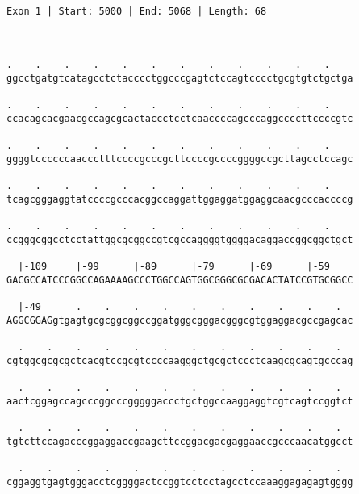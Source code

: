 \documentclass{article}
\begin{document}
 \begin{Verbatim}
 
Exon 1 | Start: 5000 | End: 5068 | Length: 68



.    .    .    .    .    .    .    .    .    .    .    .    
ggcctgatgtcatagcctctacccctggcccgagtctccagtcccctgcgtgtctgctga
                                                            
.    .    .    .    .    .    .    .    .    .    .    .    
ccacagcacgaacgccagcgcactaccctcctcaaccccagcccaggccccttccccgtc
                                                            
.    .    .    .    .    .    .    .    .    .    .    .    
ggggtccccccaaccctttccccgcccgcttccccgccccggggccgcttagcctccagc
                                                            
.    .    .    .    .    .    .    .    .    .    .    .    
tcagcgggaggtatccccgcccacggccaggattggaggatggaggcaacgcccaccccg
                                                            
.    .    .    .    .    .    .    .    .    .    .    .    
ccgggcggcctcctattggcgcggccgtcgccaggggtggggacaggaccggcggctgct
                                                            
  |-109     |-99      |-89      |-79      |-69      |-59    
GACGCCATCCCGGCCAGAAAAGCCCTGGCCAGTGGCGGGCGCGACACTATCCGTGCGGCC
                                                            
  |-49      .    .    .    .    .    .    .    .    .    .  
AGGCGGAGgtgagtgcgcggcggccggatgggcgggacgggcgtggaggacgccgagcac
                                                            
  .    .    .    .    .    .    .    .    .    .    .    .  
cgtggcgcgcgctcacgtccgcgtccccaagggctgcgctccctcaagcgcagtgcccag
                                                            
  .    .    .    .    .    .    .    .    .    .    .    .  
aactcggagccagcccggcccgggggaccctgctggccaaggaggtcgtcagtccggtct
                                                            
  .    .    .    .    .    .    .    .    .    .    .    .  
tgtcttccagacccggaggaccgaagcttccggacgacgaggaaccgcccaacatggcct
                                                            
  .    .    .    .    .    .    .    .    .    .    .    .  
cggaggtgagtgggacctcggggactccggtcctcctagcctccaaaggagagagtgggg
                                                            

\end{Verbatim}
\end{document}
